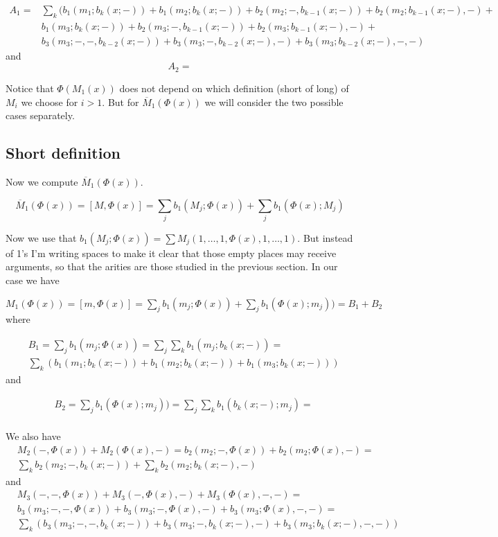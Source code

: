 \documentclass[twoside]{article}
\begin{document}
\begin{align*}
A_1=&\sum_k ( b_1(m_1;b_k(x;-))+b_1(m_2;b_k(x;-))+b_2(m_2;-,b_{k-1}(x;-))+b_2(m_2;b_{k-1}(x;-),-)+\\
&b_1(m_3;b_k(x;-))+b_2(m_3;-,b_{k-1}(x;-))+b_2(m_3;b_{k-1}(x;-),-)+\\
& b_3(m_3;-,-,b_{k-2}(x;-))+b_3(m_3;-,b_{k-2}(x;-),-)+b_3(m_3;b_{k-2}(x;-),-,-)
\end{align*}
and
$$A_2=$$


Notice that $\Phi(M_1(x))$ does not depend on which definition (short of long) of $M_i$ we choose for $i>1$. But for $\overline{M}_1(\Phi(x))$ we will consider the two possible cases separately.

\subsection{Short definition}

Now we compute $\overline{M}_1(\Phi(x))$.

$$\overline{M}_1(\Phi(x))=[M,\Phi(x)]=\sum_j b_1(M_j;\Phi(x))+\sum_j b_1(\Phi(x);M_j)$$

Now we use that $b_1(M_j;\Phi(x))=\sum M_j(1,\dots, 1,\Phi(x),1,\dots, 1)$. But instead of 1's I'm writing spaces to make it clear that those empty places may receive arguments, so that the arities are those studied in the previous section. In our case we have

$
M_1(\Phi(x))=[m,\Phi(x)]=\sum_j b_1(m_j;\Phi(x))+\sum_j b_1(\Phi(x);m_j))=B_1+B_2
$
where

\begin{align*}
&B_1=\sum_j b_1(m_j;\Phi(x))=\sum_j\sum_k b_1(m_j;b_k(x;-))=\\
&\sum_k(b_1(m_1;b_k(x;-))+b_1(m_2;b_k(x;-))+b_1(m_3;b_k(x;-)))
\end{align*}
and

\begin{align*}
&B_2=\sum_j b_1(\Phi(x);m_j))=\sum_j\sum_k b_1(b_k(x;-);m_j)=\\
\end{align*}

We also have
\begin{align*}
&M_2(-,\Phi(x))+M_2(\Phi(x),-)=b_2(m_2;-,\Phi(x))+b_2(m_2;\Phi(x),-)=\\
&\sum_k b_2(m_2; -,b_k(x;-))+\sum_k b_2(m_2;b_k(x;-),-)
\end{align*}
and
\begin{align*}
&M_3(-,-,\Phi(x))+M_3(-,\Phi(x),-)+M_3(\Phi(x),-,-)=\\
&b_3(m_3;-,-,\Phi(x))+b_3(m_3;-,\Phi(x),-)+b_3(m_3;\Phi(x),-,-)=\\
&\sum_k (b_3(m_3; -,-,b_k(x;-))+ b_3(m_3;-,b_k(x;-),-)+b_3(m_3;b_k(x;-),-,-))
\end{align*}
\end{document}
